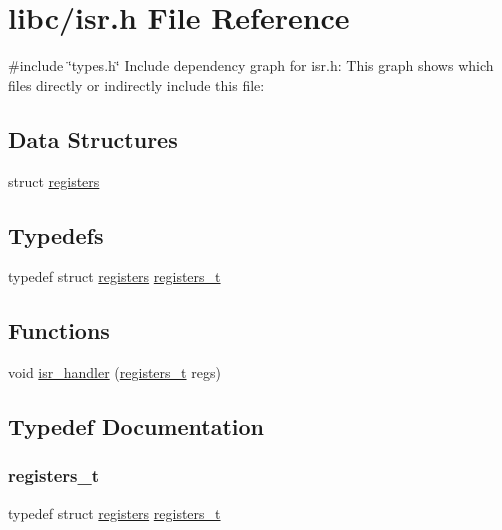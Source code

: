\hypertarget{a00095}{}\section{libc/isr.h File Reference}
\label{a00095}
{\ttfamily \#include \char`\"{}types.\+h\char`\"{}}\newline
Include dependency graph for isr.\+h\+:
This graph shows which files directly or indirectly include this file\+:
\subsection*{Data Structures}
\begin{DoxyCompactItemize}
\item 
struct \hyperlink{a00202}{registers}
\end{DoxyCompactItemize}
\subsection*{Typedefs}
\begin{DoxyCompactItemize}
\item 
typedef struct \hyperlink{a00202}{registers} \hyperlink{a00095_adf58dbaf6139b4957c348711f2026957_adf58dbaf6139b4957c348711f2026957}{registers\+\_\+t}
\end{DoxyCompactItemize}
\subsection*{Functions}
\begin{DoxyCompactItemize}
\item 
void \hyperlink{a00095_a700e3ca056bf69296370f504f2cb6cc8_a700e3ca056bf69296370f504f2cb6cc8}{isr\+\_\+handler} (\hyperlink{a00095_adf58dbaf6139b4957c348711f2026957_adf58dbaf6139b4957c348711f2026957}{registers\+\_\+t} regs)
\end{DoxyCompactItemize}


\subsection{Typedef Documentation}
\mbox{\label{a00095_adf58dbaf6139b4957c348711f2026957_adf58dbaf6139b4957c348711f2026957}} 
\subsubsection{\texorpdfstring{registers\+\_\+t}{registers\_t}}
{\footnotesize\ttfamily typedef struct \hyperlink{a00202}{registers}  \hyperlink{a00095_adf58dbaf6139b4957c348711f2026957_adf58dbaf6139b4957c348711f2026957}{registers\+\_\+t}}



